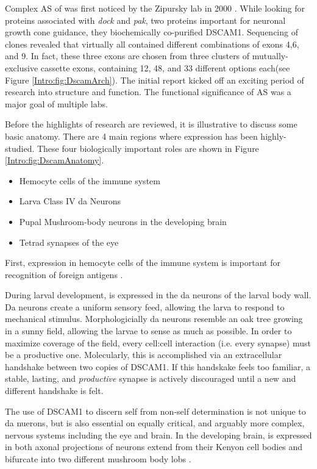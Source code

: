     Complex AS of\dscam{} was first noticed by the Zipursky lab in 2000 \citep{Schmucker2000}. While looking for proteins associated with \textit{dock} and \textit{pak}, two proteins important for neuronal growth cone guidance, they biochemically co-purified DSCAM1. Sequencing of \dscam{} clones revealed that virtually all contained different combinations of exons 4,6, and 9. In fact, these three exons are chosen from three clusters of mutually-exclusive cassette exons, containing 12, 48, and 33 different options each(see Figure \ref{Intro:fig:DscamArch}). The initial report kicked off an exciting period of research into \dscam{} structure and function. The functional significance of \dscam{} AS was a major goal of multiple labs.

    Before the highlights of \dscam{} research are reviewed, it is illustrative to discuss some basic \flies{} anatomy. There are 4 main regions where \dscam{} expression has been highly-studied. These four biologically important roles are shown in Figure \ref{Intro:fig:DscamAnatomy}.

    \begin{itemize} \itemsep0.5pt \parskip0pt  %
      \item Hemocyte cells of the immune system
      \item Larva Class IV da Neurons 
      \item Pupal Mushroom-body neurons in the developing brain
      \item Tetrad synapses of the eye
      \end{itemize}

    First, \dscam{} expression in hemocyte cells of the immune system is important for recognition of foreign antigens \citep{Watson2005}. 

    During larval development, \dscam{} is expressed in the da neurons of the larval body wall. Da neurons create a uniform sensory feed, allowing the larva to respond to mechanical stimulus. Morphologicially da neurons resemble an oak tree growing in a sunny field, allowing the larvae to sense as much as possible. In order to maximize coverage of the field, every cell:cell interaction (i.e. every synapse) must be a productive one. Molecularly, this is accomplished via an extracellular handshake between two copies of DSCAM1. If this handskake feels too familiar, a stable, lasting, and \textit{productive} synapse is actively discouraged until a new and different handshake is felt. 

    The use of DSCAM1 to discern self from non-self determination is not unique to da nuerons, but is also essential on equally critical, and arguably more complex, nervous systems including the eye and brain. In the developing brain, \dscam{} is expressed in both axonal projections of neurons extend from their Kenyon cell bodies and bifurcate into two different mushroom body lobs \citep{Zhan2004}. 

